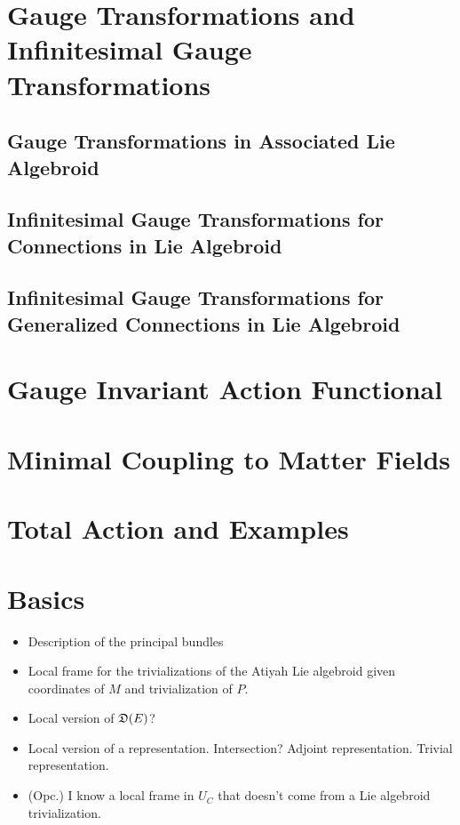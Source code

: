 \section{Gauge Transformations and Infinitesimal Gauge Transformations}

\subsection{Gauge Transformations in Associated Lie Algebroid}

\subsection{Infinitesimal Gauge Transformations for Connections in Lie Algebroid}

\subsection{Infinitesimal Gauge Transformations for Generalized Connections in Lie Algebroid}

\section{Gauge Invariant Action Functional}

\section{Minimal Coupling to Matter Fields}

\section{Total Action and Examples}

\section{Basics}

    \begin{itemize}
            
        \item Description of the principal bundles
        
        \item Local frame for the trivializations of the Atiyah Lie algebroid given coordinates of $M$ and trivialization of $P$.
        
        \item Local version of $\mathfrak{D}(E)$? 
        
        \item Local version of a representation. Intersection? Adjoint representation. Trivial representation.
        
        \item (Opc.) I know a local frame in $U_C$ that doesn't come from a Lie algebroid trivialization.
        
        \end{itemize}

